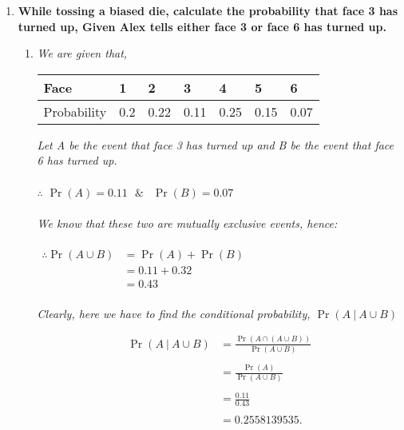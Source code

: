 \documentclass{article}
\begin{document}
\begin{enumerate}
\item \textbf{While tossing a biased die, calculate the probability that
face 3 has turned up, Given Alex tells either face 3 or face 6 has turned up.}

\begin{enumerate}
  \item\textit{We are given that,}
        \begin{center}
        \begin{tabular}{ | m{5em} | m{1cm}| m{1cm} | m{1cm} | m{1cm} | m{1cm} | m{1cm} | }
        \hline
        Face & 1 & 2 & 3 & 4 & 5 & 6\\
        \hline
        Probability & 0.2 & 0.22 & 0.11 & 0.25 & 0.15 & 0.07\\
        \hline
        \end{tabular}
        \end{center}

        \textit{Let A be the event that face 3 has turned up and B be the event that face 6 has turned up.}\\\\
        $\therefore $ $\Pr(A) = 0.11\ \ \ \&\ \ $ $\Pr(B) = 0.07$\\\\
        \textit{We know that these two are mutually exclusive events, hence:}\\\\
        $\begin{aligned}
        \therefore \Pr(A \cup B) & = \Pr(A) + \Pr(B)\\
        & = 0.11 + 0.32 \\
        & = 0.43
        \end{aligned}$\\\\
        \textit{Clearly, here we have to find the conditional probability, $\Pr(A \ |\ A \cup B)$}

        \begin{align*}
        \Pr(A \ |\ A \cup B) & = \frac{\Pr(A \cap (A \cup B))}{\Pr(A \cup B)}\\\\
        & = \frac{\Pr(A)}{\Pr(A \cup B)}\\\\
        & = \frac{0.11}{0.43}\\\\
        & = 0.2558139535.
        \end{align*}


\end{enumerate}
\end{enumerate}
\end{document}
